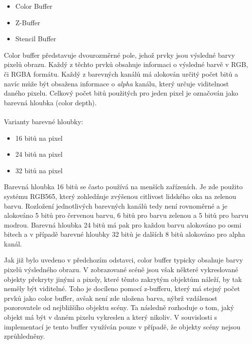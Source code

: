 \begin{itemize}
\item Color Buffer
\item Z-Buffer
\item Stencil Buffer
\end{itemize}

Color buffer představuje dvourozměrné pole, jehož prvky jsou výsledné barvy pixelů obrazu. Každý z těchto prvků obsahuje informaci o výsledné barvě v RGB, či RGBA formátu. Každý z barevných kanálů má alokován určitý počet bitů a navíc může být obsažena informace o \textit{alpha} kanálu, který určuje viditelnost daného pixelu. Celkový počet bitů použitých pro jeden pixel je označován jako barevná hloubka (color depth). \\ \\ Varianty barevné hloubky:

\begin{itemize}
\item 16 bitů na pixel
\item 24 bitů na pixel
\item 32 bitů na pixel
\end{itemize} 

Barevná hloubka 16 bitů se často používá na menších zařízeních. Je zde použito systému RGB565, který zohledňuje zvýšenou citlivost lidského oka na zelenou barvu. Rozložení jednotlivých barevných kanálů tedy není rovnoměrné a je alokováno 5 bitů pro červenou barvu, 6 bitů pro barvu zelenou a 5 bitů pro barvu modrou. Barevná hloubka 24 bitů má pak pro každou barvu alokováno po osmi bitech a v případě barevné hloubky 32 bitů je dalších 8 bitů alokováno pro alpha kanál.

Jak již bylo uvedeno v předchozím odstavci, color buffer typicky obsahuje barvy pixelů výsledného obrazu. V zobrazované scéně jsou však některé vykreslované objekty překryty jinými a pixely, které těmto zakrytým objektům náleží, by tak neměly být viditelné. Toho je docíleno pomocí z-bufferu, který má stejný počet prvků jako color buffer, avšak není zde uložena barva, nýbrž vzdálenost pozorovatele od nejbližšího objektu scény. Ta následně rozhoduje o tom, jaký objekt má být v daném pixelu vykreslen a který nikoliv. V souvislosti s implementací je tento buffer využíván pouze v případě, že objekty scény nejsou zprůhledněny.

